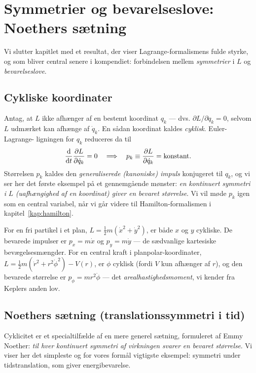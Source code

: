 \section{Symmetrier og bevarelseslove: Noethers sætning}

Vi slutter kapitlet med et resultat, der viser Lagrange-formalismens
fulde styrke, og som bliver central senere i kompendiet: forbindelsen
mellem \emph{symmetrier} i $L$ og \emph{bevarelseslove}.

\subsection{Cykliske koordinater}

Antag, at $L$ ikke afhænger af en bestemt koordinat $q_k$ — dvs.
$\partial L/\partial q_k = 0$, selvom $L$ udmærket kan afhænge af
$\dot q_k$. En sådan koordinat kaldes \emph{cyklisk}. Euler-Lagrange-
ligningen for $q_k$ reduceres da til
\begin{equation}
  \dv{t}\pdv{L}{\dot q_k} = 0
  \quad\Longrightarrow\quad
  p_k \equiv \pdv{L}{\dot q_k} = \text{konstant}.
  \label{eq:cyklisk-bevarelse}
\end{equation}
Størrelsen $p_k$ kaldes den \emph{generaliserede (kanoniske)
impuls}
konjugeret til $q_k$, og vi ser her det første eksempel på et
gennemgående mønster: \emph{en kontinuert symmetri i $L$ (uafhængighed
af en koordinat) giver en bevaret størrelse}. Vi vil møde $p_k$ igen
som en central variabel, når vi går videre til Hamilton-formalismen i
kapitel~\ref{kap:hamilton}.

\begin{eksempel}
For en fri partikel i et plan, $L=\frac12 m(\dot x^2+\dot y^2)$, er
både $x$ og $y$ cykliske. De bevarede impulser er
$p_x=m\dot x$ og $p_y=m\dot y$ — de sædvanlige kartesiske
bevægelsesmængder. For en central kraft i planpolar-koordinater,
$L=\frac12 m(\dot r^2+r^2\dot\phi^2)-V(r)$, er $\phi$ cyklisk (fordi
$V$ kun afhænger af $r$), og den bevarede størrelse er
$p_\phi=mr^2\dot\phi$ — det \emph{arealhastighedsmoment}, vi kender fra
Keplers anden lov.
\end{eksempel}

\subsection{Noethers sætning (translationssymmetri i tid)}

Cyklicitet er et specialtilfælde af en mere generel sætning, formuleret
af Emmy Noether: \emph{til hver kontinuert symmetri af virkningen svarer
en bevaret størrelse}. Vi viser her det simpleste og for vores formål
vigtigste eksempel: symmetri under tidstranslation, som giver
energibevarelse.

